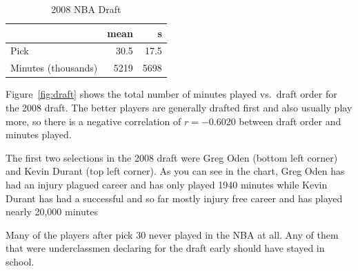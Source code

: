\documentclass[letterpaper, landscape]{exam}
\begin{document}
\begin{questions}
        \begin{table}[H]
          \centering
          \begin{tabular}{lrr}
            \toprule
                                & mean & s \\
            \midrule
            Pick                & 30.5 & 17.5 \\
            Minutes (thousands) & 5219 & 5698 \\
            \bottomrule
          \end{tabular}
          \caption{2008 NBA Draft}
        \end{table}

        Figure~\ref{fig:draft} shows the total number of minutes played vs.\ draft
        order for the 2008 draft.  The better players are generally drafted first
        and also usually play more, so there is a negative correlation of 
        $r = -0.6020$ between draft order and minutes played.

        The first two selections in the 2008 draft were Greg Oden (bottom left
        corner) and Kevin Durant (top left corner).  As you can see in the
        chart, Greg Oden has had an injury plagued career and has only played
        1940 minutes while Kevin Durant has had a successful and so far mostly
        injury free career and has played nearly 20,000 minutes

        Many of the players after pick 30 never played in the NBA at all.  Any
        of them that were underclassmen declaring for the draft early should
        have stayed in school.

\end{questions}
\end{document}
